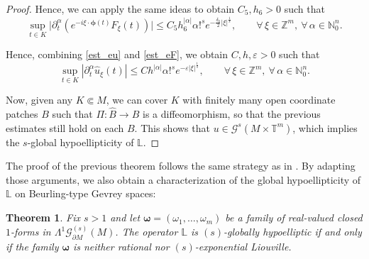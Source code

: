 \documentclass[11pt,reqno]{amsart}
\numberwithin{equation}{section}
\newtheorem{theorem}{Theorem}[section]
\begin{document}
\begin{proof}
	Hence, we can apply the same ideas to obtain \(C_5,h_6>0\) such that
	\begin{equation}\label{est_eF}
		\sup_{t\in K}\bigl|\partial_t^\alpha(e^{-i\xi\cdot\boldsymbol{\phi}(t)}F_\xi(t))\bigr|
		\leq
		C_5h_6^{|\alpha|}\alpha!^s e^{-\frac{\delta_0}{2}|\xi|^{\frac{1}{s}}},\qquad\forall\,\xi\in\mathbb{Z}^m,\ \forall\,\alpha\in\mathbb{N}_0^n.
	\end{equation}
	
	Hence, combining \eqref{est_eu} and \eqref{est_eF}, we obtain \(C,h,\varepsilon>0\) such that
	\[
	\sup_{t\in K}|\partial_t^\alpha\widehat{u}_\xi(t)|
	\leq Ch^{|\alpha|}\alpha!^s e^{-\varepsilon|\xi|^{\frac{1}{s}}},\qquad\forall\,\xi\in\mathbb{Z}^m,\ \forall\,\alpha\in\mathbb{N}_0^n.
	\]
	
	Now, given any \(K\Subset M\), we can cover \(K\) with finitely many open coordinate patches \(B\) such that
	\(\Pi:\hat{B}\to B\) is a diffeomorphism, so that the previous estimates still hold on each $B$.
	This shows that \(u\in\mathscr{G}^s(M\times\mathbb{T}^m)\), which implies the \(s\)-global hypoellipticity of \(\mathbb{L}\).
\end{proof}

	The proof of the previous theorem follows the same strategy as in \cite[Theorem 3.4]{ADL2023gh}. By adapting those arguments, we also obtain a characterization of the global hypoellipticity of \(\mathbb{L}\) on Beurling-type Gevrey spaces:
	
	\begin{theorem}\label{gh_beurling}
		Fix \(s>1\) and let \(\boldsymbol{\omega}=(\omega_1,\dots,\omega_m)\) be a family of real-valued closed \(1\)-forms in \(\mathsf{\Lambda}^1\mathscr{G}^{(s)}_{\partial M}(M)\).
		The operator \(\mathbb{L}\) is \((s)\)-globally hypoelliptic if and only if the family \(\boldsymbol{\omega}\) is neither rational nor \((s)\)-exponential Liouville.
	\end{theorem}
	
\end{document}
